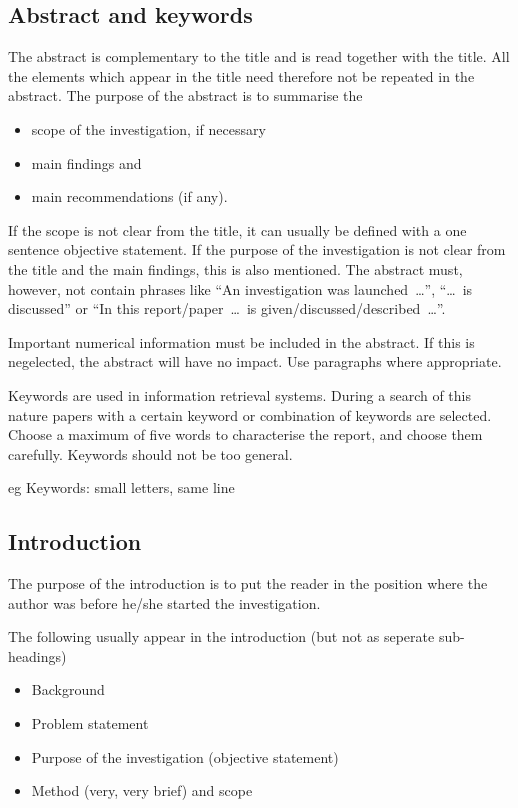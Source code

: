\documentclass[a5paper, 10pt]{article}
\begin{document}
\subsection{Abstract and keywords}
\label{sec:abstract-keywords}
The abstract is complementary to the title and is read together with
the title.  All the elements which appear in the title need therefore
not be repeated in the abstract.  The purpose of the abstract is to
summarise the
\begin{itemize}
\item scope of the investigation, if necessary
\item main findings and
\item main recommendations (if any).  
\end{itemize}
If the scope is not clear from the title, it can usually be defined
with a one sentence objective statement.  If the purpose of the
investigation is not clear from the title and the main findings, this
is also mentioned.  The abstract must, however, not contain phrases
like ``An investigation was launched~\dots'', ``\dots~is discussed'' or
``In this report/paper~\dots~is given/discussed/described~\dots''.

Important numerical information must be included in the abstract.  
If this is negelected, the abstract will have no impact.
Use paragraphs where appropriate.

Keywords are used in information retrieval systems.  
During a search of this nature papers with a certain keyword or combination of
keywords are selected.  
Choose a maximum of five words to characterise the report, and choose them carefully.  
Keywords should not be too general.

eg Keywords:   small letters, same line

\subsection{Introduction}
\label{sec:introduction}
The purpose of the introduction is to put the reader in the position
where the author was before he/she started the investigation.

The following usually appear in the introduction (but not as seperate sub-headings)
\begin{itemize}
\item Background
\item Problem statement
\item Purpose of the investigation (objective statement)
\item Method (very, very brief) and scope
\end{itemize}
\end{document}
